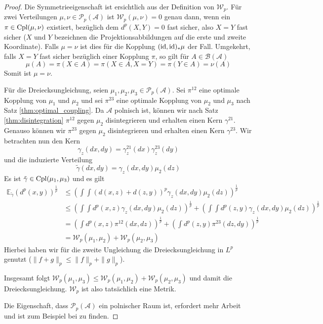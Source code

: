 \begin{proof}
    Die Symmetrieeigenschaft ist ersichtlich aus der Definition von $\mathcal{W}_p$. Für zwei Verteilungen $\mu,\nu \in \mathcal{P}_p(\mathcal{A})$ ist $\mathcal{W}_p(\mu, \nu) = 0$ genau dann, wenn ein $\pi \in \operatorname{Cpl}(\mu,\nu)$ existiert, bezüglich dem $d^p(X,Y)=0$ fast sicher, also $X=Y$ fast sicher ($X$ und $Y$ bezeichnen die Projektionsabbildungen auf die erste und zweite Koordinate). Falls $\mu=\nu$ ist dies für die Kopplung $(\operatorname{id}, \operatorname{id})_*\mu$ der Fall. Umgekehrt, falls $X=Y$ fast sicher bezüglich einer Kopplung $\pi$, so gilt für $A \in \mathcal{B}(\mathcal{A})$ 
    $$\mu(A) = \pi(X \in A) = \pi(X\in A, X=Y) = \pi(Y \in A) = \nu(A)$$ 
    Somit ist $\mu=\nu$.

    Für die Dreiecksungleichung, seien $\mu_1, \mu_2, \mu_3 \in \mathcal{P}_p(\mathcal{A})$. Sei $\pi^{12}$ eine optimale Kopplung von $\mu_1$ und $\mu_2$ und sei $\pi^{23}$ eine optimale Kopplung von $\mu_2$ und $\mu_3$ nach Satz \ref{thm:optimal_coupling}. Da $\mathcal{A}$ polnisch ist, können wir nach Satz \ref{thm:disintegration} $\pi^{12}$ gegen $\mu_2$ disintegrieren und erhalten einen Kern $\gamma^{21}$. Genauso können wir $\pi^{23}$ gegen $\mu_2$ disintegrieren und erhalten einen Kern $\gamma^{23}$. Wir betrachten nun den Kern
    $$\gamma_z(dx, dy) = \gamma_z^{21}(dx)\gamma_z^{23}(dy)$$
    und die induzierte Verteilung
    $$\tilde{\gamma}(dx, dy) = \gamma_z(dx,dy)\mu_2(dz)$$
    Es ist $\tilde{\gamma} \in \operatorname{Cpl}(\mu_1, \mu_3)$ und es gilt 
    \begin{align*}
        \mathbb{E}_{\tilde{\gamma}}(d^p(x,y))^\frac{1}{p} &\leq \left( \int \int \left( d(x,z) + d(z, y) \right)^p \gamma_z(dx,dy)\mu_2(dz) \right)^\frac{1}{p} \\
        &\leq \left(\int\!\!\!\int\!\!d^p(x,z) \gamma_z(dx,dy) \mu_2(dz)\right)^\frac{1}{p} + \left( \int\!\!\!\int\!\! d^p(z,y) \gamma_z(dx,dy) \mu_2(dz)\right)^\frac{1}{p} \\
        &= \left( \int d^p(x,z)\pi^{12}(dx, dz)  \right)^\frac{1}{p} + \left(\int d^p(z,y) \pi^{23}(dz,dy) \right)^\frac{1}{p} \\
        &= \mathcal{W}_p(\mu_1, \mu_2) + \mathcal{W}_p(\mu_2, \mu_3)
    \end{align*}
    Hierbei haben wir für die zweite Ungleichung die Dreiecksungleichung in $L^p$ genutzt ($\|f+g\|_p \leq \|f\|_p + \|g\|_p$). 

    Insgesamt folgt $\mathcal{W}_p(\mu_1, \mu_3) \leq \mathcal{W}_p(\mu_1, \mu_2) + \mathcal{W}_p(\mu_2, \mu_3)$ und damit die Dreiecksungleichung. $\mathcal{W}_p$ ist also tatsächlich eine Metrik. 

    Die Eigenschaft, dass $\mathcal{P}_p(\mathcal{A})$ ein polnischer Raum ist, erfordert mehr Arbeit und ist zum Beispiel bei \cite[Satz 6.18]{villani} zu finden.
\end{proof}
